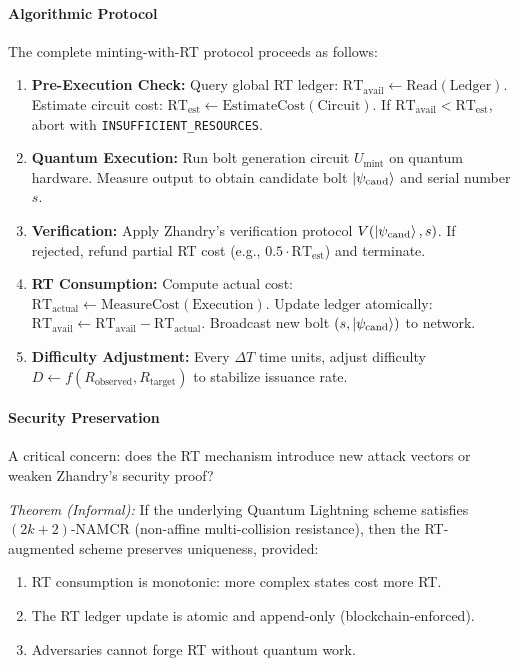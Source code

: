 \documentclass[a4paper,10.5pt,twoside]{article}
\begin{document}
\paragraph{Algorithmic Protocol}

The complete minting-with-RT protocol proceeds as follows:

\begin{enumerate}
    \item \textbf{Pre-Execution Check:}  
    Query global RT ledger: $\text{RT}_{\text{avail}} \gets \text{Read}(\text{Ledger})$.  
    Estimate circuit cost: $\text{RT}_{\text{est}} \gets \text{EstimateCost}(\text{Circuit})$.  
    If $\text{RT}_{\text{avail}} < \text{RT}_{\text{est}}$, abort with \texttt{INSUFFICIENT\_RESOURCES}.
    
    \item \textbf{Quantum Execution:}  
    Run bolt generation circuit $U_{\text{mint}}$ on quantum hardware.  
    Measure output to obtain candidate bolt $\ket{\psi_{\text{cand}}}$ and serial number $s$.
    
    \item \textbf{Verification:}  
    Apply Zhandry's verification protocol $V(\ket{\psi_{\text{cand}}}, s)$.  
    If rejected, refund partial RT cost (e.g., $0.5 \cdot \text{RT}_{\text{est}}$) and terminate.
    
    \item \textbf{RT Consumption:}  
    Compute actual cost: $\text{RT}_{\text{actual}} \gets \text{MeasureCost}(\text{Execution})$.  
    Update ledger atomically: $\text{RT}_{\text{avail}} \gets \text{RT}_{\text{avail}} - \text{RT}_{\text{actual}}$.  
    Broadcast new bolt $(s, \ket{\psi_{\text{cand}}})$ to network.
    
    \item \textbf{Difficulty Adjustment:}  
    Every $\Delta T$ time units, adjust difficulty $D \gets f(R_{\text{observed}}, R_{\text{target}})$ to stabilize issuance rate.
\end{enumerate}

\paragraph{Security Preservation}

A critical concern: does the RT mechanism introduce new attack vectors or weaken Zhandry's security proof?

\textit{Theorem (Informal):} If the underlying Quantum Lightning scheme satisfies $(2k+2)$-NAMCR (non-affine multi-collision resistance),  
then the RT-augmented scheme preserves uniqueness, provided:
\begin{enumerate}
    \item RT consumption is monotonic: more complex states cost more RT.
    \item The RT ledger update is atomic and append-only (blockchain-enforced).
    \item Adversaries cannot forge RT without quantum work.
\end{enumerate}
\end{document}
